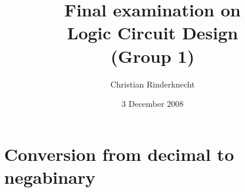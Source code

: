 \documentclass[11pt,a4paper]{article}
\title{Final examination on\\ Logic Circuit Design\\ (Group 1)}
\author{Christian Rinderknecht}
\date{3 December 2008}
\begin{document}
\maketitle
\thispagestyle{empty}

\section{Conversion from decimal to negabinary}


\end{document}
